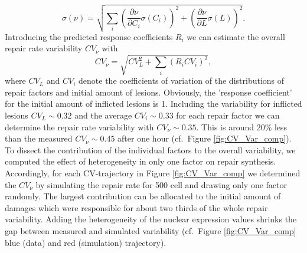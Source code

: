 \begin{equation}
\sigma(\nu) = \sqrt{\sum_{i}\left(\frac{\partial \nu}{\partial C_i}\sigma(C_i) \right)^2 + \left(\frac{\partial \nu}{\partial L}\sigma(L)\right)^2 }.
\label{eqn:lawoferrorPropagation}
\end{equation} 
Introducing the predicted response coefficients $R_i$ we can estimate the overall repair rate variability $CV_{\nu}$ with
\begin{equation}
CV_{\nu} = \sqrt{CV_{L}^2 + \sum_{i}(R_iCV_i)^2},
\label{eqn:lawOfErrorPropI}
\end{equation}
where $CV_{L}$ and $CV_i$ denote the coefficients of variation of the distributions of repair factors and initial amount of lesions. Obviously, the 'response coefficient' for the initial amount of inflicted lesions is 1. Including the variability for inflicted lesions $CV_L \sim 0.32$ and the average $CV_i \sim 0.33$ for each repair factor we can determine the repair rate variability with $CV_{\nu} \sim 0.35$. This is around 20\% less than the measured $CV_{\nu} \sim 0.45$ after one hour (cf.\ Figure \ref{fig:CV_Var_comp}).\\
To dissect the contribution of the individual factors to the
overall variability, we computed the effect of heterogeneity in only one factor on repair synthesis. Accordingly, for each CV-trajectory in Figure \ref{fig:CV_Var_comp} we determined the $CV_{\nu}$ by simulating the repair rate for 500 cell and drawing only one factor randomly. The largest contribution can be allocated to the initial amount of damages which were responsible for about two thirds of the whole repair variability. Adding the heterogeneity of the nuclear expression values shrinks the gap between measured and simulated variability (cf.\ Figure \ref{fig:CV_Var_comp} blue (data) and red (simulation) trajectory).

